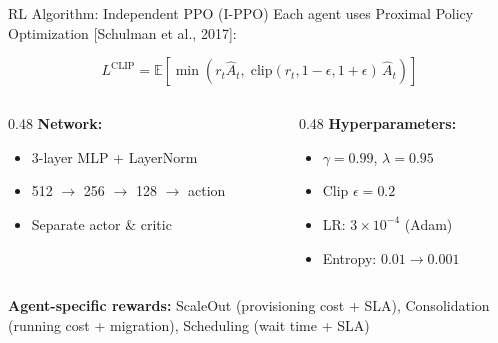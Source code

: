 \documentclass[aspectratio=169,11pt]{beamer}
\begin{document}
\begin{frame}{RL Algorithm: Independent PPO (I-PPO)}
Each agent uses Proximal Policy Optimization [Schulman et al., 2017]:

\[
  L^{\text{CLIP}} = \mathbb{E}\left[\min\left(
    r_t \hat{A}_t,\;
    \text{clip}(r_t, 1{-}\epsilon, 1{+}\epsilon)\,\hat{A}_t
  \right)\right]
\]

\begin{columns}[T]
\begin{column}{0.48\textwidth}
\textbf{Network:}
\begin{itemize}
  \item 3-layer MLP + LayerNorm
  \item 512 $\to$ 256 $\to$ 128 $\to$ action
  \item Separate actor \& critic
\end{itemize}
\end{column}
\begin{column}{0.48\textwidth}
\textbf{Hyperparameters:}
\begin{itemize}
  \item $\gamma = 0.99$, $\lambda = 0.95$
  \item Clip $\epsilon = 0.2$
  \item LR: $3 \times 10^{-4}$ (Adam)
  \item Entropy: $0.01 \to 0.001$
\end{itemize}
\end{column}
\end{columns}

\vspace{0.3cm}
\textbf{Agent-specific rewards:} ScaleOut (provisioning cost + SLA), Consolidation (running cost + migration), Scheduling (wait time + SLA)
\end{frame}
\end{document}
